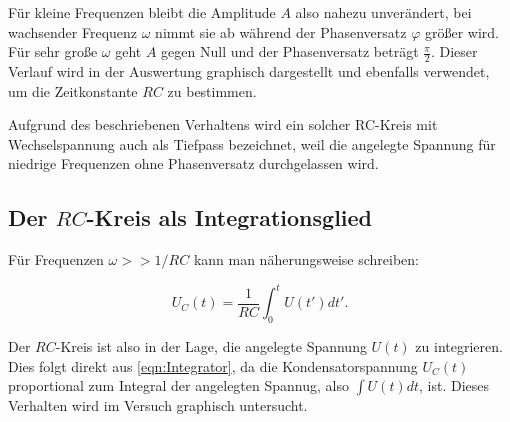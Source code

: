 Für kleine Frequenzen bleibt die Amplitude $A$ also nahezu unverändert, bei wachsender Frequenz $\omega$ nimmt sie ab während
der Phasenversatz $\varphi$ größer wird. Für sehr große $\omega$ geht $A$ gegen Null und der Phasenversatz beträgt $\frac{\pi}{2}$.
Dieser Verlauf wird in der Auswertung graphisch dargestellt und ebenfalls verwendet, um die Zeitkonstante $RC$ zu bestimmen.

Aufgrund des beschriebenen Verhaltens wird ein solcher RC-Kreis mit Wechselspannung auch als Tiefpass bezeichnet, weil die angelegte
Spannung für niedrige Frequenzen ohne Phasenversatz durchgelassen wird.

\subsection{Der $RC$-Kreis als Integrationsglied}
\label{sec:theorie-integration}
Für Frequenzen $\omega >> 1/RC$ kann man näherungsweise schreiben:

\begin{equation}
    U_{C}(t) = \frac{1}{RC}\int_{0}^{t}U({t}')d{t}'. \label{eqn:Integrator}
\end{equation}

Der $RC$-Kreis ist also in der Lage, die angelegte Spannung $U(t)$ zu integrieren. Dies folgt direkt aus \autoref{eqn:Integrator},
da die Kondensatorspannung $U_{C}(t)$ proportional zum Integral der angelegten Spannug, also $\int U(t)dt$, ist.
Dieses Verhalten wird im Versuch graphisch untersucht.